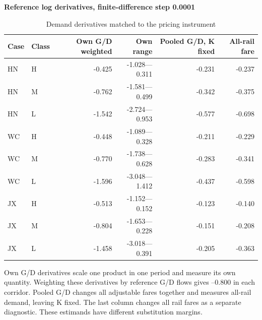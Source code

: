 \begin{table}[htbp]\centering
\caption{Demand derivatives matched to the pricing instrument}\label{tab:round2_elasticities}
\begin{minipage}{.95\textwidth}\fontsize{8}{10}\selectfont{}\setlength{\tabcolsep}{2pt}\renewcommand{\arraystretch}{1.08}
\par\noindent\textbf{Reference log derivatives, finite-difference step 0.0001}\par\smallskip
\begin{tabular*}{\linewidth}{@{\extracolsep{\fill}}llrrrr@{}}\toprule
Case & Class & Own G/D weighted & Own range & Pooled G/D, K fixed & All-rail fare \\
\midrule
HN & H & -0.425 & -1.028---0.311 & -0.231 & -0.237 \\
HN & M & -0.762 & -1.581---0.499 & -0.342 & -0.375 \\
HN & L & -1.542 & -2.724---0.953 & -0.577 & -0.698 \\
WC & H & -0.448 & -1.089---0.328 & -0.211 & -0.229 \\
WC & M & -0.770 & -1.738---0.628 & -0.283 & -0.341 \\
WC & L & -1.596 & -3.048---1.412 & -0.437 & -0.598 \\
JX & H & -0.513 & -1.152---0.152 & -0.123 & -0.140 \\
JX & M & -0.804 & -1.653---0.228 & -0.151 & -0.208 \\
JX & L & -1.458 & -3.018---0.391 & -0.205 & -0.363 \\
\bottomrule\end{tabular*}\par\medskip
\par\noindent\fontsize{8}{9.5}\selectfont Own G/D derivatives scale one product in one period and measure its own quantity. Weighting these derivatives by reference G/D flows gives --0.800 in each corridor. Pooled G/D changes all adjustable fares together and measures all-rail demand, leaving K fixed. The last column changes all rail fares as a separate diagnostic. These estimands have different substitution margins.
\end{minipage}\end{table}
